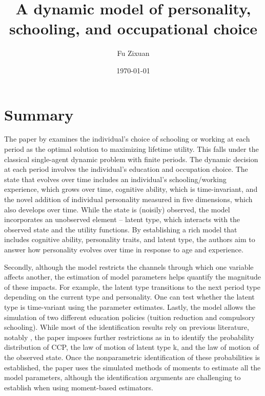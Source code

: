 \documentclass[12pt]{article}
\title{\textbf{A dynamic model of personality, schooling, and occupational choice}}
\author{Fu Zixuan}
\date{\today}
\begin{document}
\maketitle




\section{Summary}
The paper by \citet{todd2020dynamic} examines the individual's choice of
schooling or working at each period as the optimal solution to maximizing
lifetime utility. This falls under the classical single-agent dynamic problem
with finite periods. The dynamic decision at each period involves the
individual's education and occupation choice. The state that evolves over time
includes an individual's schooling/working experience, which grows over time,
cognitive ability, which is time-invariant, and the novel addition of
individual personality measured in five dimensions, which also develops over
time. While the state is (noisily) observed, the model incorporates an
unobserved element -- latent type, which interacts with the observed state and
the utility functions. By establishing a rich model that includes
cognitive ability, personality traits, and latent type, the authors aim to
answer how personality evolves over time in response to age and experience.

Secondly, although the model restricts the channels through which one variable
affects another, the estimation of model parameters helps quantify the
magnitude of these impacts. For example, the latent type transitions to the
next period type depending on the current type and personality. One can test
whether the latent type is time-variant using the parameter estimates. Lastly,
the model allows the simulation of two different education policies (tuition
reduction and compulsory schooling). While most of the identification results
rely on previous literature, notably \cite{hu2012nonparametric}, the paper
imposes further restrictions as in \citet{hu2017simple} to identify the
probability distribution of CCP, the law of motion of latent type k, and the
law of motion of the observed state. Once the nonparametric identification of
these probabilities is established, the paper uses the simulated methods of
moments to estimate all the model parameters, although the identification
arguments are challenging to establish when using moment-based estimators.
\end{document}
